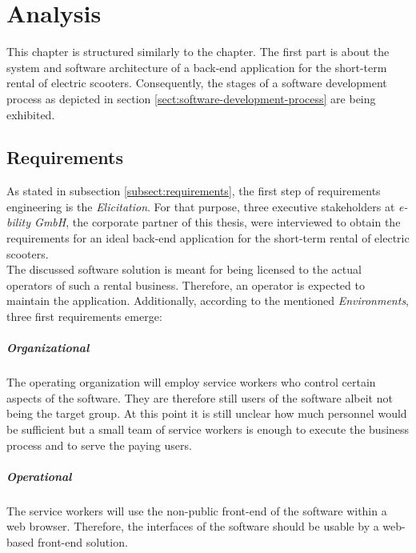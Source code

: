 \documentclass[12pt,a4paper,twoside]{report}
\begin{document}
\chapter{Analysis} \label{chap:analysis}


This chapter is structured similarly to the \textit{}
chapter. The first part is about the system and software architecture of
a back-end application for the short-term rental of electric scooters.
Consequently, the stages of a software development process as depicted
in section \ref{sect:software-development-process} are being exhibited.


\section{Requirements} \label{subsect:app-requirements}

As stated in subsection \ref{subsect:requirements}, the first step of
requirements engineering is the \textit{Elicitation}.
For that purpose, three executive stakeholders
at \textit{e-bility GmbH}, the corporate partner of this thesis, were interviewed
to obtain the requirements for an ideal back-end application for the
short-term rental of electric scooters.\\
The discussed software solution is meant for being licensed to
the actual operators of such a rental business. Therefore, an operator
is expected to maintain the application. Additionally, according to the
mentioned \textit{Environments}, three first requirements emerge:

\paragraph{Organizational}
The operating organization will employ service workers who
control certain aspects of the software. They are therefore still users of the
software albeit not being the target group. At this point it is still unclear
how much personnel would be sufficient but a small team of service workers is
enough to execute the business process and to serve the paying users.

\paragraph{Operational}
The service workers will use the non-public front-end of the software within a
web browser. Therefore, the interfaces of the software should be usable by
a web-based front-end solution.
\end{document}
